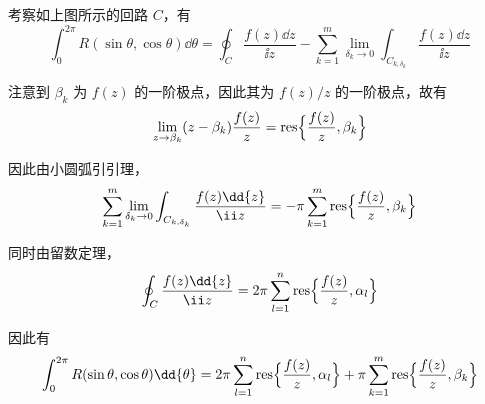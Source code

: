 \begin{question}
\begin{solution}
考察如上图所示的回路 \(C\)，有
\[
\int_0^{2\pi} R(\sin\theta,\cos\theta)\dd{\theta}=\oint_C \frac{f(z)\dd{z}}{\ii z}-\sum_{k=1}^{m}\lim_{\delta_k\to0}\int_{C_{k,\delta_k}}\frac{f(z)\dd{z}}{\ii z}
\]

注意到 \(\beta_k\) 为 \(f(z)\) 的一阶极点，因此其为 \(f(z)/z\) 的一阶极点，故有
\[
\lim_{z\to\beta_k}(z-\beta_k)\frac{f(z)}{z}= \operatorname{res}\Bigl\{\frac{f(z)}{z},\beta_k\Bigr\}
\]

因此由小圆弧引引理，
\[
\sum_{k=1}^{m}\lim_{\delta_k\to0}\int_{C_{k,\delta_k}}\frac{f(z)\dd{z}}{\ii z}=-\pi\sum_{k=1}^{m}\operatorname{res}\Bigl\{\frac{f(z)}{z},\beta_k\Bigr\}
\]

同时由留数定理，
\[
\oint_C \frac{f(z)\dd{z}}{\ii z}=2\pi\sum_{l=1}^{n}\operatorname{res}\Bigl\{\frac{f(z)}{z},\alpha_l\Bigr\}
\]

因此有
\[
\int_0^{2\pi} R(\sin\theta,\cos\theta)\dd{\theta} = 2\pi\sum_{l=1}^{n}\operatorname{res}\Bigl\{\frac{f(z)}{z},\alpha_l\Bigr\} + \pi\sum_{k=1}^{m}\operatorname{res}\Bigl\{\frac{f(z)}{z},\beta_k\Bigr\}
\]
\end{solution}
\end{question}

